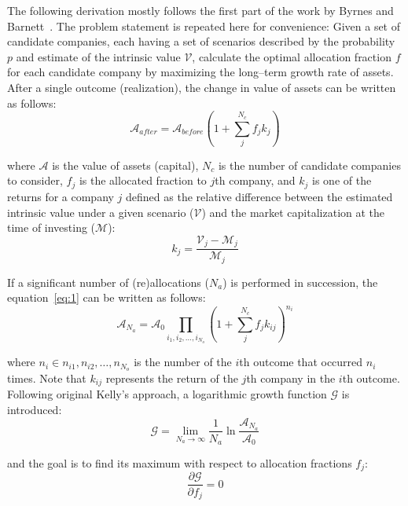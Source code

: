 \documentclass{article}
\begin{document}
The following derivation mostly follows the first part of the work by Byrnes and
Barnett~\cite{byrnesBarnett}. The problem statement is repeated here for
convenience: Given a set of candidate companies, each having a set of scenarios
described by the probability $p$ and estimate of the intrinsic value
$\mathcal{V}$, calculate the optimal allocation fraction $f$ for each candidate
company by maximizing the long--term growth rate of assets. After a single
outcome (realization), the change in value of assets can be written as follows:
\begin{equation}
\label{eq:1}
    \mathcal{A}_{after}
  = 
    \mathcal{A}_{before}
    \left( 1 + \sum_{j}^{N_c} f_j k_j \right)
\end{equation} 

\noindent where $\mathcal{A}$ is the value of assets (capital), $N_c$ is the
number of candidate companies to consider, $f_j$ is the allocated fraction to
$j$th company, and $k_j$ is one of the returns for a company $j$ defined as the
relative difference between the estimated intrinsic value under a given scenario
($\mathcal{V}$) and the market capitalization at the time of investing
($\mathcal{M}$):
\begin{equation}
\label{eq:2}
    k_j = \frac{\mathcal{V}_j - \mathcal{M}_j}{\mathcal{M}_j}
\end{equation}

\noindent If a significant number of (re)allocations ($N_a$) is performed in
succession, the equation~\eqref{eq:1} can be written as follows:
\begin{equation}
\label{eq:3}
    \mathcal{A}_{N_a}
  = 
    \mathcal{A}_{0} \prod_{i_1, i_2, \hdots, i_{N_o}}
    \left( 1 + \sum_{j}^{N_c} f_j k_{ij} \right)^{n_i}
\end{equation} 

\noindent where $n_i \in {n_{i1}, n_{i2}, \hdots, n_{N_o}} $ is the number of
the $i$th outcome that occurred $n_i$ times. Note that $k_{ij}$ represents the
return of the $j$th company in the $i$th outcome. Following original Kelly's
approach, a logarithmic growth function $\mathcal{G}$ is introduced:
\begin{equation}
\label{eq:4}
    \mathcal{G} = \lim_{N_a \to \infty} \frac{1}{N_a} \ln
        \frac{\mathcal{A}_{N_a}}{\mathcal{A}_0}
\end{equation}

\noindent and the goal is to find its maximum with respect to allocation
fractions $f_j$:
\begin{equation}
\label{eq:5}
    \frac{\partial \mathcal{G}}{\partial f_j} = 0
\end{equation}
\end{document}
